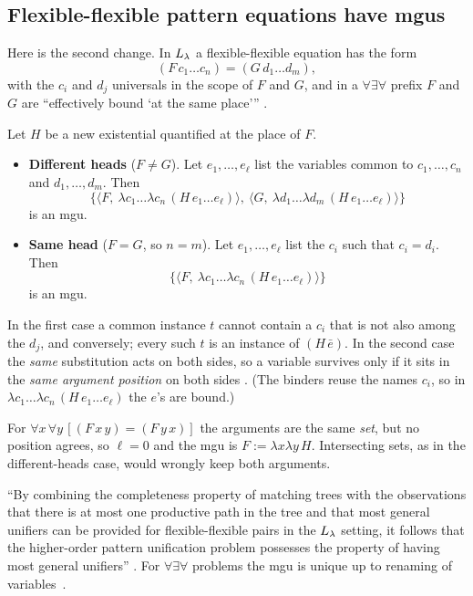 \subsection{Flexible-flexible pattern equations have mgus}\label{sec:hounif-ff}

Here is the second change. In $L_\lambda$ a flexible-flexible equation has the form
\[(F\,c_1\dots c_n)=(G\,d_1\dots d_m),\]
with the $c_i$ and $d_j$ universals in the scope of $F$ and $G$, and in a $\forall\exists\forall$ prefix $F$ and $G$ are
\enquote{effectively bound \enquote{at the same place}} .

\begin{proposition}\label{prop:hounif-ff}
Let $H$ be a new existential quantified at the place of $F$.
\begin{itemize}
  \item \textbf{Different heads} ($F\ne G$). Let $e_1,\dots,e_\ell$ list the variables common to $c_1,\dots,c_n$ and
    $d_1,\dots,d_m$. Then
    \[\{\langle F,\ \lambda c_1\dots\lambda c_n\,(H\,e_1\dots e_\ell)\rangle,\ \langle G,\ \lambda d_1\dots\lambda d_m\,(H\,e_1\dots e_\ell)\rangle\}\]
    is an mgu.
  \item \textbf{Same head} ($F=G$, so $n=m$). Let $e_1,\dots,e_\ell$ list the $c_i$ such that $c_i=d_i$.
    Then
    \[\{\langle F,\ \lambda c_1\dots\lambda c_n\,(H\,e_1\dots e_\ell)\rangle\}\]
    is an mgu.
\end{itemize}
\end{proposition}
In the first case a common instance $t$ cannot contain a $c_i$ that is not also among the $d_j$, and conversely;
every such $t$ is an instance of $(H\,\bar e)$. In the second case the \emph{same} substitution acts on both sides,
so a variable survives only if it sits in the \emph{same argument position} on both sides . (The
binders reuse the names $c_i$, so in $\lambda c_1\dots\lambda c_n\,(H\,e_1\dots e_\ell)$ the $e$'s are bound.)

\begin{pitfall}
For $\forall x\,\forall y\,[(F\,x\,y)=(F\,y\,x)]$ the arguments are the same \emph{set}, but no position agrees, so
$\ell=0$ and the mgu is $F:=\lambda x\lambda y\,H$. Intersecting sets, as in the different-heads case, would
wrongly keep both arguments.
\end{pitfall}

\begin{theorem}\label{thm:hounif-mgu-exist}
\enquote{By combining the completeness property of matching trees with the observations that there is at most one
productive path in the tree and that most general unifiers can be provided for flexible-flexible pairs in the
$L_\lambda$ setting, it follows that the higher-order pattern unification problem possesses the property of having
most general unifiers} . For $\forall\exists\forall$ problems the mgu is unique up to renaming of
variables~\cite[Prop.~9.2]{Miller1991}.
\end{theorem}

